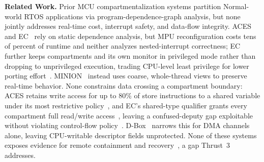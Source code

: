 \textbf{Related Work.}
Prior MCU compartmentalization systems partition Normal-world RTOS applications via program-dependence-graph analysis, but none jointly addresses real-time cost, interrupt safety, and data-flow integrity. ACES~\cite{clements2018aces} and EC~\cite{khan2023ec} rely on static dependence analysis, but MPU reconfiguration costs tens of percent of runtime and neither analyzes nested-interrupt correctness; EC further keeps compartments and its own monitor in privileged mode rather than dropping to unprivileged execution, trading CPU-level least privilege for lower porting effort~\cite{khan2023ec}. MINION~\cite{kim2018securing} instead uses coarse, whole-thread views to preserve real-time behavior. None constrains data crossing a compartment boundary: ACES retains write access for up to 80\% of store instructions to a shared variable under its most restrictive policy~\cite{clements2018aces}, and EC's shared-type qualifier grants every compartment full read/write access~\cite{khan2023ec}, leaving a confused-deputy gap exploitable without violating control-flow policy~\cite{chen2005non}. D-Box~\cite{mera2022d} narrows this for DMA channels alone, leaving CPU-writable descriptor fields unprotected.
None of these systems exposes evidence for remote containment and recovery~\cite{clements2018aces,kim2018securing,mera2022d,khan2023ec}, a gap Thrust~3 addresses.

